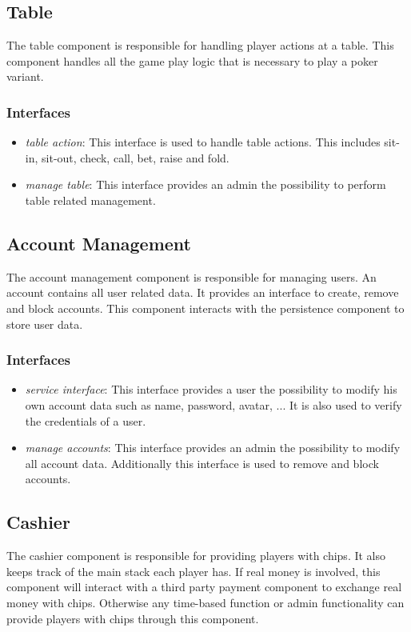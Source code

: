 \documentclass[a4paper,11pt]{report}
\begin{document}
\subsection{Table}
The table component is responsible for handling player actions at a table. This component handles all the game play logic that is necessary to play a poker variant.
\subsubsection{Interfaces}
\begin{itemize}
\item \emph{table action}: This interface is used to handle table actions. This includes sit-in, sit-out, check,  call, bet, raise and fold.
\item \emph{manage table}: This interface provides an admin the possibility to perform table related management.
\end{itemize}

\subsection{Account Management}
The account management component is responsible for managing users. An account contains all user related data. It provides an interface to create, remove and block accounts. This component interacts with the persistence component to store user data.
\subsubsection{Interfaces}
\begin{itemize}
\item \emph{service interface}: This interface provides a user the possibility to modify his own account data such as name, password, avatar, ... It is also used to verify the credentials of a user.
\item \emph{manage accounts}: This interface provides an admin the possibility to modify all account data. Additionally this interface is used to remove and block accounts. 
\end{itemize}

\subsection{Cashier}
The cashier component is responsible for providing players with chips. It also keeps track of the main stack each player has. If real money is involved, this component will interact with a third party payment component to exchange real money with chips. Otherwise any time-based function or admin functionality can provide players with chips through this component.
\end{document}
